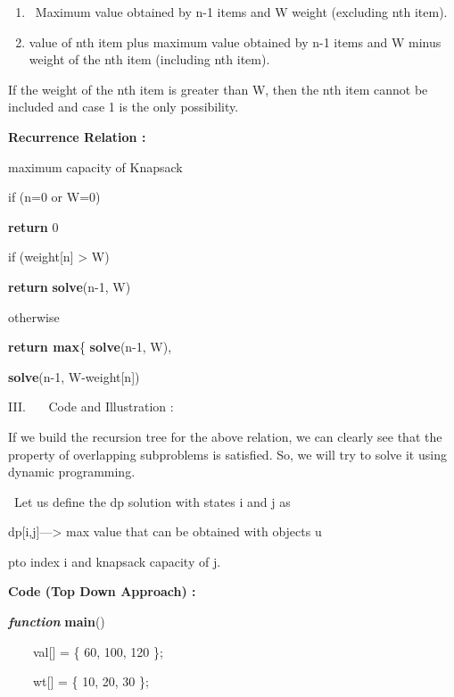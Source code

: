 \documentclass[letterpaper]{article}
\newcommand\liststyleWWNumiv{%
\renewcommand\theenumi{\arabic{enumi}}
\renewcommand\theenumii{\alph{enumii}}
\renewcommand\theenumiii{\roman{enumiii}}
\renewcommand\theenumiv{\arabic{enumiv}}
\renewcommand\labelenumi{\theenumi.}
\renewcommand\labelenumii{\theenumii.}
\renewcommand\labelenumiii{\theenumiii.}
\renewcommand\labelenumiv{\theenumiv.}
}
\begin{document}
\begin{multicols}{2}
\liststyleWWNumiv
\begin{enumerate}
\item \ Maximum value obtained by n-1 items and W weight (excluding nth item). 
\item value of nth item plus maximum value obtained by n-1 items and W minus weight of the nth item (including nth
item).
\end{enumerate}
If the weight of the nth item is greater than W, then the nth item cannot be included and case 1 is the only
possibility. 


\bigskip

{\bfseries
Recurrence Relation : }

maximum capacity of Knapsack 

if (n=0 or W=0) 

\textbf{return} 0 


\bigskip

if (weight[n] {\textgreater} W) 

\textbf{return} \textbf{solve}(n-1, W) 

otherwise 

\textbf{return max}\{ \textbf{solve}(n-1, W), 

\textbf{solve}(n-1, W-weight[n]) \ 


\bigskip

\bigskip
{\mdseries
III. \ \ \ Code and Illustration :}


\bigskip

If we build the recursion tree for the above relation, we can clearly see that the property of overlapping subproblems
is satisfied. So, we will try to solve it using dynamic programming.


\bigskip

\ Let us define the dp solution with states i and j as 

dp[i,j]---{\textgreater} max value that can be obtained with objects u 

pto index i and knapsack capacity of j. 


\bigskip
{\bfseries
Code (Top Down Approach) :}

\textbf{\textit{\textcolor[rgb]{0.2509804,0.25882354,0.30588236}{function}}}\textcolor[rgb]{0.2509804,0.25882354,0.30588236}{
}\textbf{\textcolor[rgb]{0.2509804,0.25882354,0.30588236}{main}}\textcolor[rgb]{0.2509804,0.25882354,0.30588236}{()}

{\color[rgb]{0.2509804,0.25882354,0.30588236}
\ \ \ \ val[] = \{ 60, 100, 120 \};}

{\color[rgb]{0.2509804,0.25882354,0.30588236}
\ \ \ \ wt[] = \{ 10, 20, 30 \};}


\end{multicols}
\end{document}
